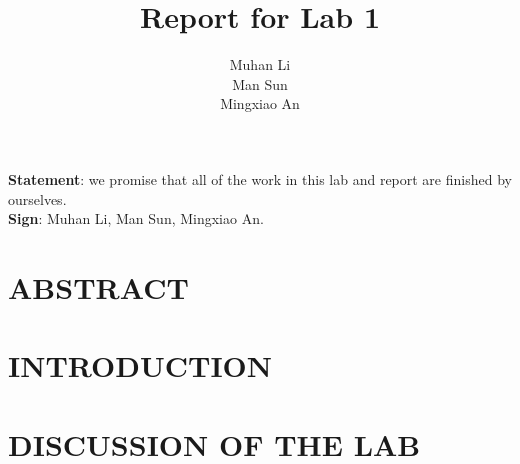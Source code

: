 \documentclass[12pt,letterpaper,onecolumn]{article}
\title{\titlefont Report for Lab 1\vspace{300pt}}
\author{\authorfont Muhan Li\\ \authorfont Man Sun\\ \authorfont Mingxiao An}
\date{}
\begin{document}
	\maketitle
	\thispagestyle{empty}
	\vspace{40pt}
	\hfill \newline
	\textbf{Statement}: we promise that all of the work in this lab and report are finished by ourselves.\\
	\textbf{Sign}: Muhan Li, Man Sun, Mingxiao An.\\
	\newpage
	\tableofcontents
	\newpage
	\section{ABSTRACT}	
		
	\section{INTRODUCTION}
		
	\section{DISCUSSION OF THE LAB}
		
\end{document}
